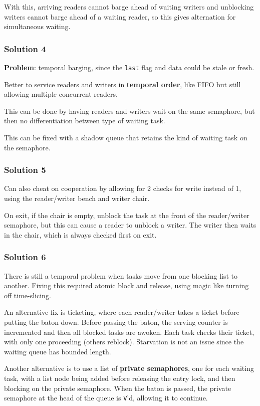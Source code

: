 \documentclass[11pt]{article}
\begin{document}
With this, arriving readers cannot barge ahead of waiting writers and unblocking
writers cannot barge ahead of a waiting reader, so this gives alternation for
simultaneous waiting.
\subsubsection{Solution 4}
\label{sec:org1151489}
\textbf{Problem}: temporal barging, since the \texttt{last} flag and data could be stale or fresh.

Better to service readers and writers in \textbf{temporal order}, like FIFO but still allowing
multiple concurrent readers.

This can be done by having readers and writers wait on the same semaphore, but then no
differentiation between type of waiting task.

This can be fixed with a shadow queue that retains the kind of waiting task on the
semaphore.
\subsubsection{Solution 5}
\label{sec:org069de0a}
Can also cheat on cooperation by allowing for 2 checks for write instead of 1,
using the reader/writer bench and writer chair.

On exit, if the chair is empty, unblock the task at the front of the reader/writer semaphore,
but this can cause a reader to unblock a writer.
The writer then waits in the chair, which is always checked first on exit.
\subsubsection{Solution 6}
\label{sec:org2e17e34}
There is still a temporal problem when tasks move from one blocking list to another.
Fixing this required atomic block and release, using magic like turning off time-slicing.

An alternative fix is ticketing, where each reader/writer takes a ticket before putting the
baton down. Before passing the baton, the serving counter is incremented and then all
blocked tasks are awoken.
Each task checks their ticket, with only one proceeding (others reblock).
Starvation is not an issue since the waiting queue has bounded length.

Another alternative is to use a list of \textbf{private semaphores}, one for each waiting
task, with a list node being added before releasing the entry lock, and then blocking
on the private semaphore.
When the baton is passed, the private semaphore at the head of the queue is \texttt{V}'d, allowing
it to continue.
\end{document}
